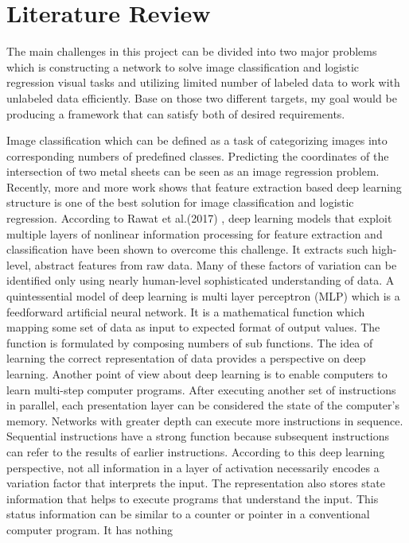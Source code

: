 \section{Literature Review}
The main challenges in this project can be divided into two major problems which is constructing a network to solve 
image classification and logistic regression visual tasks and utilizing limited number of labeled data to work with 
unlabeled data efficiently. Base on those two different targets, my goal would be producing a framework that can satisfy
both of desired requirements.

Image classification which can be defined as a task of categorizing images into corresponding numbers 
of predefined classes. Predicting the coordinates of the intersection of two metal sheets can be seen
as an image regression problem. Recently, more and more work shows that feature extraction based 
deep learning structure is one of the best solution for image classification and logistic regression.
According to Rawat et al.(2017) \cite{article}, deep learning models that exploit multiple layers of nonlinear 
information processing for feature extraction and classification have been shown to overcome this
 challenge. It extracts such high-level, abstract features from raw data. Many of these factors 
of variation can be identified only using nearly human-level sophisticated understanding of data. A quintessential model of 
deep learning is multi layer perceptron (MLP) \cite{Gardner_1998} which is a feedforward artificial neural network. It is a mathematical function 
which mapping some set of data as input to expected format of output values. The function is formulated by composing numbers
of sub functions. The idea of learning the correct representation of data provides a perspective on deep learning. 
Another point of view about deep learning is to enable computers to learn multi-step computer programs. After executing 
another set of instructions in parallel, each presentation layer can be considered the state of the computer's memory. 
Networks with greater depth can execute more instructions in sequence. Sequential instructions have a strong function 
because subsequent instructions can refer to the results of earlier instructions. According to this deep learning 
perspective, not all information in a layer of activation necessarily encodes a variation factor that interprets the 
input. The representation also stores state information that helps to execute programs that understand the input. 
This status information can be similar to a counter or pointer in a conventional computer program. It has nothing 

